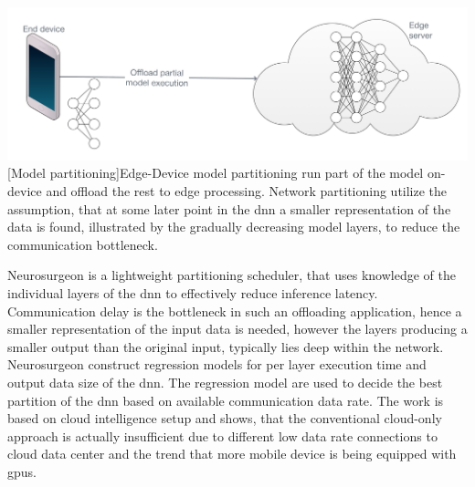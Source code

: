 \begin{minipage}[t]{\linewidth}    
	\centering
	\includegraphics[width=\linewidth]{figures/models/partitioning}
	[Model partitioning]{Edge-Device model partitioning run part of the model on-device and offload the rest to edge processing. Network partitioning utilize the assumption, that at some later point in the \gls{dnn} a smaller representation of the data is found, illustrated by the gradually decreasing model layers, to reduce the communication bottleneck. }
	\label{fig:offlaoding}
\end{minipage}

Neurosurgeon \cite{kang_neurosurgeon:_2017} is a lightweight partitioning scheduler, that uses knowledge of the individual layers of the \gls{dnn} to effectively reduce inference latency. Communication delay is the bottleneck in such an offloading application, hence a smaller representation of the input data is needed, however the layers producing a smaller output than the original input, typically lies deep within the network. Neurosurgeon construct regression models for per layer execution time and output data size of the \gls{dnn}. The regression model are used to decide the best partition of the \gls{dnn} based on available communication data rate. The work is based on cloud intelligence setup and shows, that the conventional cloud-only approach is actually insufficient due to different low data rate connections to cloud data center and the trend that more mobile device is being equipped with \gls{gpu}s. 



